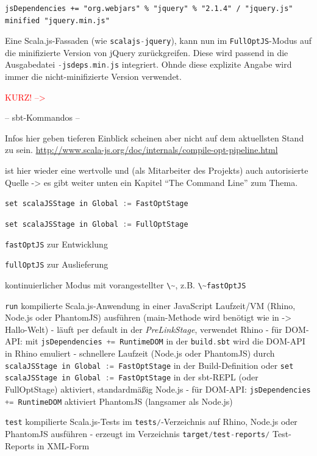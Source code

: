 \documentclass[a4paper, 12pt, hidelinks, listof=totoc, listoftables=totoc, bibliography=totoc]{scrreprt}
\newcommand{\code}[1]{\lstinline[language=Scala, style=inline]|#1|}
\newcommand{\TODO}[1]{\textcolor{red}{#1}\newline}
\begin{document}
\begin{lstlisting}[style=snippet]
jsDependencies += "org.webjars" % "jquery" % "2.1.4" / "jquery.js" minified "jquery.min.js"
\end{lstlisting}

Eine Scala.js-Fassaden (wie \code{scalajs-jquery}), kann nun im \code{FullOptJS}-Modus auf die minifizierte Version von jQuery zurückgreifen. Diese wird passend in die Ausgabedatei \code{-jsdeps.min.js} integriert. Ohnde diese explizite Angabe wird immer die nicht-minifizierte Version verwendet.








\TODO{KURZ!  --> }

-- sbt-Kommandos --

Infos hier geben tieferen Einblick scheinen aber nicht auf dem aktuellsten Stand zu sein.
\url{http://www.scala-js.org/doc/internals/compile-opt-pipeline.html}

\cite[\#TheCommandLine]{haoyi.HOS} ist hier wieder eine wertvolle und (als Mitarbeiter des Projekts) auch autorisierte Quelle -> es gibt weiter unten ein Kapitel "`The Command Line"' zum Thema.

\code{set scalaJSStage in Global := FastOptStage}

\code{set scalaJSStage in Global := FullOptStage}


\code{fastOptJS} zur Entwicklung

\code{fullOptJS} zur Auslieferung

kontinuierlicher Modus mit vorangestellter  \code{\~}, z.B. \code{\~fastOptJS}



\code{run} kompilierte Scala.js-Anwendung in einer JavaScript Laufzeit/VM (Rhino, Node.js oder PhantomJS) ausführen (main-Methode wird benötigt wie in -> Hallo-Welt)
	- läuft per default in der \emph{PreLinkStage}, verwendet Rhino
		- für \ac{DOM}-\ac{API}: mit \code{jsDependencies += RuntimeDOM} in der \code{build.sbt} wird die DOM-\ac{API} in Rhino emuliert
	- schnellere Laufzeit (Node.js oder PhantomJS) durch \code{scalaJSStage in Global := FastOptStage} in der Build-Definition oder \code{set scalaJSStage in Global := FastOptStage} in der sbt-\ac{REPL} (oder FullOptStage) aktiviert, standardmäßig Node.js
		- für \ac{DOM}-\ac{API}: \code{jsDependencies += RuntimeDOM} aktiviert PhantomJS (langsamer als Node.js)

\code{test} kompilierte Scala.js-Tests im \code{tests/}-Verzeichnis auf Rhino, Node.js oder PhantomJS ausführen
	- erzeugt im Verzeichnis \code{target/test-reports/} Test-Reports in \ac{XML}-Form
\end{document}
